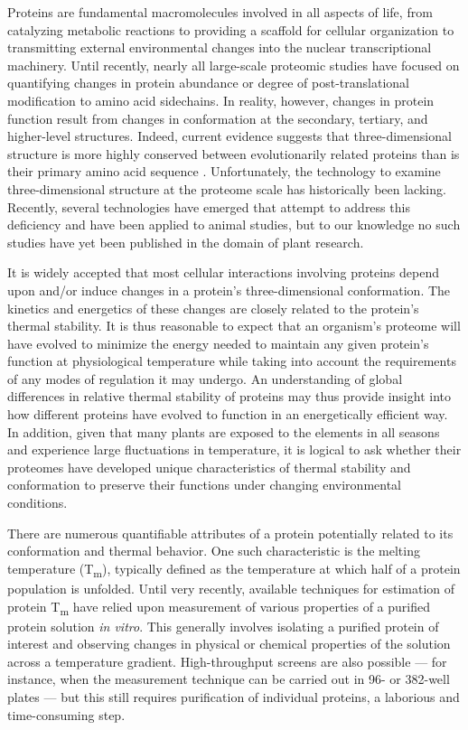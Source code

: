\documentclass[11pt,letter]{article}\usepackage[]{graphicx}\usepackage[]{color}
\newcommand{\Tm}{T\textsubscript{m}}
\begin{document}
Proteins are fundamental macromolecules involved in all aspects of life, from
catalyzing metabolic reactions to providing a scaffold for cellular
organization to transmitting external environmental changes into the nuclear
transcriptional machinery. Until recently, nearly all large-scale proteomic
studies have focused on quantifying changes in protein abundance or degree of
post-translational modification to amino acid sidechains. In reality, however,
changes in protein function result from changes in conformation at the
secondary, tertiary, and higher-level structures. Indeed, current evidence
suggests that three-dimensional structure is more highly conserved between
evolutionarily related proteins than is their primary amino acid sequence
\cite{cramer_structural_2001,shih_bacterial_2006,ingles-prieto_conservation_2013}.
Unfortunately, the technology to examine three-dimensional structure at the
proteome scale has historically been lacking. Recently, several technologies
have emerged that attempt to address this deficiency and have been applied to
animal studies, but to our knowledge no such studies have yet been published
in the domain of plant research.

It is widely accepted that most cellular interactions involving proteins
depend upon and/or induce changes in a protein's three-dimensional
conformation. The kinetics and energetics of these changes are closely related
to the protein's thermal stability. It is thus reasonable to expect that an
organism's proteome will have evolved to minimize the energy needed to
maintain any given protein's function at physiological temperature while
taking into account the requirements of any modes of regulation it may
undergo. An understanding of global differences in relative thermal stability
of proteins may thus provide insight into how different proteins have evolved
to function in an energetically efficient way. In addition, given that many
plants are exposed to the elements in all seasons and experience large
fluctuations in temperature, it is logical to ask whether their proteomes have
developed unique characteristics of thermal stability and conformation to
preserve their functions under changing environmental conditions.

There are numerous quantifiable attributes of a protein potentially related to
its conformation and thermal behavior. One such characteristic is the melting
temperature (\Tm{}), typically defined as the temperature at which half of a
protein population is unfolded. Until very recently, available techniques for
estimation of protein \Tm{} have relied upon measurement of various properties
of a purified protein solution \textit{in vitro}. This generally involves
isolating a purified protein of interest and observing changes in physical or
chemical properties of the solution across a temperature gradient.
High-throughput screens are also possible --- for instance, when the
measurement technique can be carried out in 96- or 382-well plates --- but
this still requires purification of individual proteins, a laborious and
time-consuming step.
\end{document}
